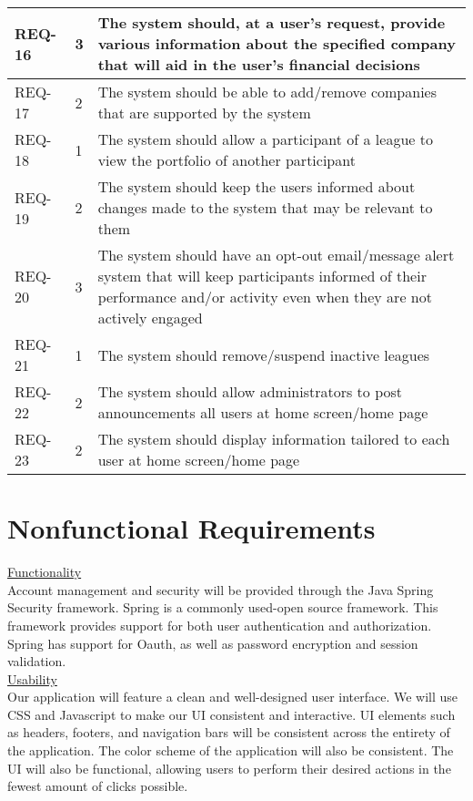 \documentclass[11pt,letterpaper,oneside]{memoir}
\begin{document}
\begin{longtable}{|p{0.6in}|p{0.5in}|p{4.6in}|}
REQ-16&
3&
The system should, at a user’s request, provide various information about the specified company that will aid in the user’s financial decisions \\ \hline
REQ-17&
2&
The system should be able to add/remove companies that are supported by the system \\ \hline
REQ-18&1&
The system should allow a participant of a league to view the portfolio of another participant \\ \hline
REQ-19 &2 &The system should keep the users informed about changes made to the system that may be relevant to them \\ \hline
REQ-20 &3  & The system should have an opt-out email/message alert system that will keep participants informed of their performance and/or activity even when they are not actively engaged \\ \hline
REQ-21 & 1 & The system should remove/suspend inactive leagues \\ \hline
REQ-22 &2 & The system should allow administrators to post announcements all users at home screen/home page \\ \hline
REQ-23 & 2 & The system should display information tailored to each user at home screen/home page \\ \hline
 
\end{longtable}
\setlength{\parindent}{0em}
\section{Nonfunctional Requirements}
\underline{Functionality} \\
Account management and security will be provided through the Java Spring Security framework. Spring is a commonly used-open source framework. This framework provides support for both user authentication and authorization. Spring has support for Oauth, as well as password encryption and session validation. \\

\underline{Usability} \\
Our application will feature a clean and well-designed user interface. We will use CSS and Javascript to make our UI consistent and interactive. UI elements such as headers, footers, and navigation bars will be consistent across the entirety of the application. The color scheme of the application will also be consistent. The UI will also be functional, allowing users to perform their desired actions in the fewest amount of clicks possible. \\
\end{document}
